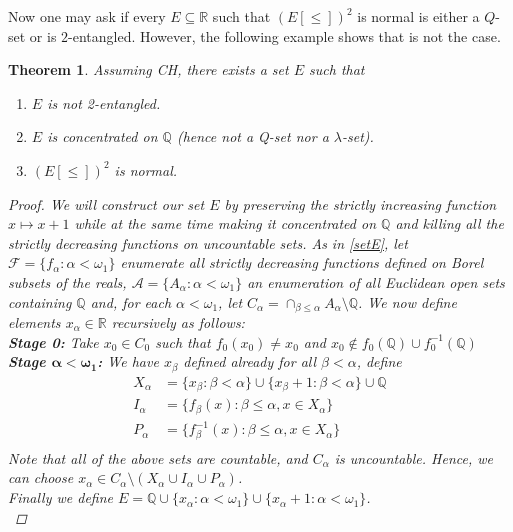 \documentclass[11pt]{amsart}
\newtheorem{theorem}{Theorem}[section]
\theoremstyle{definition}
\theoremstyle{remark}
\newcommand{\R}{\mathbb{R}}
\newcommand{\Q}{\mathbb{Q}}
\newcommand{\Aa}{\mathcal{A}}
\newcommand{\Ff}{\mathcal{F}}
\theoremstyle{plain}
\begin{document}
Now one may ask if every $E\subseteq \R$ such that $(E[\leq])^2$ is normal is either a $Q$-set or is $2$-entangled. However, the following example shows that is not the case.

\begin{theorem}
    Assuming CH, there exists a set $E$ such that 
    \begin{enumerate}
        \item $E$ is not 2-entangled.
        \item $E$ is concentrated on $\Q$ (hence not a Q-set nor a $\lambda$-set).
        \item $(E[\leq])^2$ is normal.
    \end{enumerate}
    \begin{proof}
        We will construct our set $E$ by preserving the strictly increasing function $x\mapsto x+1$ while at the same time making it concentrated on ${\mathbb Q}$ and killing all the strictly decreasing functions on uncountable sets. As in \ref{setE}, let $\Ff=\{f_\alpha:\alpha<\omega_1\}$ enumerate all strictly decreasing functions defined on Borel subsets of the reals, $\Aa=\{ A_\alpha:\alpha<\omega_1\}$ an enumeration of all Euclidean open sets containing $\Q$ and, for each $\alpha<\omega_1$, let $C_\alpha=\cap_{\beta\leq\alpha} A_\alpha \setminus \Q$. We now define elements $x_\alpha\in\R$ recursively as follows:\\
        \textbf{Stage 0:} Take $x_0\in C_0$ such that $f_0(x_0)\not=x_0$ and $x_0 \not \in f_0(\Q)\cup f_0^{-1}(\Q)$\\
    \textbf{Stage $\boldsymbol{\alpha<\omega_1}$:} We have $x_\beta$ defined already for all $\beta<\alpha$, define
    \begin{align*}
        X_\alpha&= \{x_\beta:\beta<\alpha\} \cup \{x_\beta+1: \beta<\alpha\} \cup \Q\\
        I_\alpha&=\{ f_\beta(x): \beta\leq \alpha, x\in X_\alpha \}\\
        P_\alpha&=\{ f_\beta^{-1}(x): \beta\leq\alpha, x\in X_\alpha\}\\
    \end{align*}
    Note that all of the above sets are countable, and $C_\alpha$ is uncountable. Hence, we can choose $x_\alpha\in C_\alpha\setminus (X_\alpha\cup I_\alpha\cup P_\alpha)$.    \\
    Finally we define $E=\Q\cup \{x_\alpha:\alpha<\omega_1\}\cup\{x_\alpha+1:\alpha<\omega_1\}$.\\

\end{proof}
\end{theorem}
\end{document}
